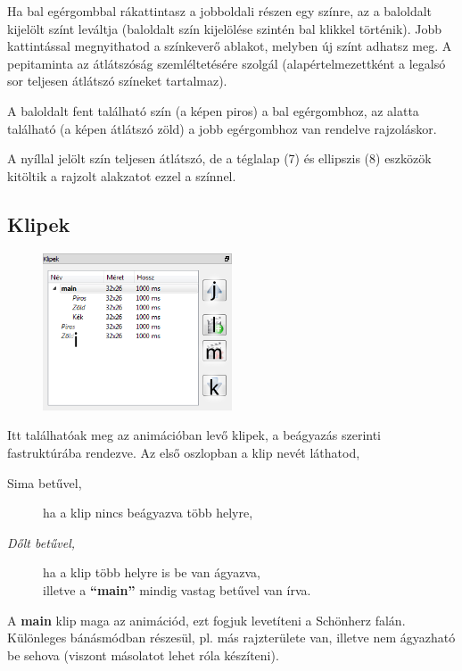 \documentclass[a4paper,12pt,release]{article}
\begin{document}
Ha bal egérgombbal rákattintasz a jobboldali részen egy színre, az a baloldalt kijelölt színt leváltja (baloldalt szín kijelölése szintén bal klikkel történik). Jobb kattintással megnyithatod a színkeverő ablakot, melyben új színt adhatsz meg. A pepitaminta az átlátszóság szemléltetésére szolgál (alapértelmezettként a legalsó sor teljesen átlátszó színeket tartalmaz).

A baloldalt fent található szín (a képen piros) a bal egérgombhoz, az alatta található (a képen átlátszó zöld) a jobb egérgombhoz van rendelve rajzoláskor.

A nyíllal jelölt szín teljesen átlátszó, de a téglalap (7) és ellipszis (8) eszközök kitöltik a rajzolt alakzatot ezzel a színnel.

\subsection{Klipek}
\begin{figure}
	\vspace{-27pt}
	\begin{center}
		\includegraphics[width=0.5\textwidth]{pics/library.png}
	\end{center}
	\vspace{-27pt}
\end{figure}
Itt találhatóak meg az animációban levő klipek, a beágyazás szerinti fastruktúrába rendezve. Az első oszlopban a klip nevét láthatod,
\begin{description}
\item[Sima betűvel,]ha a klip nincs beágyazva több helyre,
\item[\emph{Dőlt betűvel,}]ha a klip több helyre is be van ágyazva,\\
illetve a {\bf ``main''} mindig vastag betűvel van írva.
\end{description}

A {\bf main} klip maga az animációd, ezt fogjuk levetíteni a Schönherz falán. Különleges bánásmódban részesül, pl. más rajzterülete van, illetve nem ágyazható be sehova (viszont másolatot lehet róla készíteni).
\end{document}
